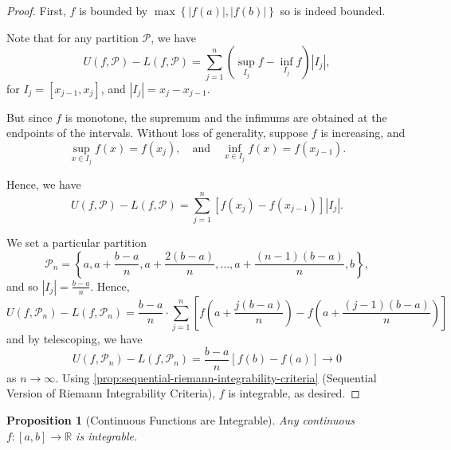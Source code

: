 \documentclass[11pt]{article}
\numberwithin{equation}{section}
\newtheorem{proposition}[theorem]{Proposition}
\theoremstyle{definition}
\theoremstyle{remark}
\newcommand{\pqty}[1]{\left(#1\right)}
\newcommand{\bqty}[1]{\left[#1\right]}
\newcommand{\Bqty}[1]{\left\{#1\right\}}
\newcommand{\abs}[1]{\left|#1\right|}
\newcommand{\ccintv}[2]{[#1,#2]}
\newcommand{\functiondomain}[3]{#1:#2\to #3}
\newcommand{\RR}{\mathbb R}
\newcommand{\qand}{\quad\text{and}\quad}
\newcommand{\partition}{\mathcal P}
\newcommand{\upperSum}{U}
\newcommand{\lowerSum}{L}
\begin{document}
\begin{proof}
    First, \(f\) is bounded by \(\max\Bqty{\abs{f\pqty{a}}, \abs{f\pqty{b}}}\) so is indeed bounded.

    Note that for any partition \(\partition\), we have
    \[
        \upperSum\pqty{f, \partition} - \lowerSum\pqty{f, \partition} = \sum_{j = 1}^{n} \pqty{\sup_{I_j} f - \inf_{I_j} f} \abs{I_j},
    \]
    for \(I_j = \ccintv{x_{j - 1}}{x_j}\), and \(\abs{I_j} = x_j - x_{j - 1}\).

    But since \(f\) is monotone, the supremum and the infimums are obtained at the endpoints of the intervals. Without loss of generality, suppose \(f\) is increasing, and
    \[
        \sup_{x \in I_j} f\pqty{x} = f\pqty{x_j}, \qand \inf_{x \in I_j} f\pqty{x} = f\pqty{x_{j - 1}}.
    \]

    Hence, we have
    \[
        \upperSum\pqty{f, \partition} - \lowerSum\pqty{f, \partition} = \sum_{j = 1}^{n} \bqty{f\pqty{x_j} - f\pqty{x_{j - 1}}} \abs{I_j}.
    \]

    We set a particular partition
    \[
        \partition_n = \Bqty{a, a + \frac{b - a}{n}, a + \frac{2\pqty{b - a}}{n}, \ldots, a + \frac{\pqty{n - 1} \pqty{b - a}}{n}, b},
    \]
    and so \(\abs{I_j} = \frac{b - a}{n}\). Hence,
    \[
        \upperSum\pqty{f, \partition_n} - \lowerSum\pqty{f, \partition_n} = \frac{b - a}{n} \cdot \sum_{j = 1}^{n} \bqty{f\pqty{a + \frac{j \pqty{b - a}}{n}} - f\pqty{a + \frac{\pqty{j - 1} \pqty{b - a}}{n}}}
    \]
    and by telescoping, we have
    \[
        \upperSum\pqty{f, \partition_n} - \lowerSum\pqty{f, \partition_n} = \frac{b - a}{n} \bqty{f\pqty{b} - f\pqty{a}} \to 0
    \]
    as \(n \to \infty\). Using \autoref{prop:sequential-riemann-integrability-criteria} (Sequential Version of Riemann Integrability Criteria), \(f\) is integrable, as desired.
\end{proof}

\begin{proposition}[Continuous Functions are Integrable]\label{analysis-unit-0151}
    \label{prop:continuous-integrable}%
    Any continuous \(\functiondomain{f}{\ccintv{a}{b}}{\RR}\) is integrable.
\end{proposition}
\end{document}
